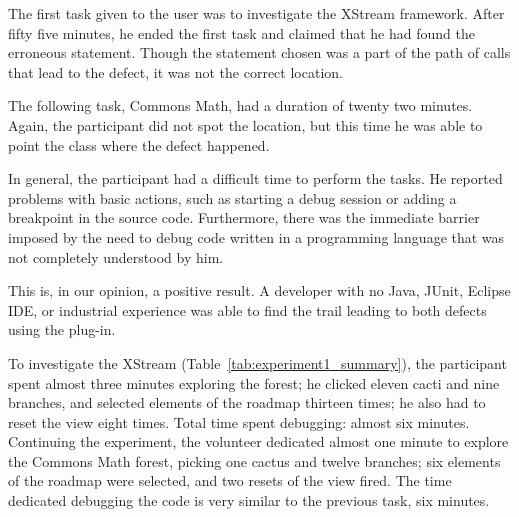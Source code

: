 The first task given to the user was to investigate the XStream framework. After
fifty five minutes, he ended the first task and claimed that he had found the
erroneous statement. Though the statement chosen was a part of the path of calls
that lead to the defect, it was not the correct location.

The following task, Commons Math, had a duration of twenty two minutes. Again,
the participant did not spot the location, but this time he was able to point
the class where the defect happened.

In general, the participant had a difficult time to perform the tasks. He
reported problems with basic actions, such as starting a debug session or
adding a breakpoint in the source code. Furthermore, there was the immediate
barrier imposed by the need to debug code written in a programming language that
was not completely understood by him.

This is, in our opinion, a positive result. A developer with no Java,
JUnit, Eclipse IDE, or industrial experience was able to find the trail leading
to both defects using the plug-in.

To investigate the XStream (Table~\ref{tab:experiment1_summary}), the
participant spent almost three minutes exploring the forest; he clicked eleven
cacti and nine branches, and selected elements of the roadmap thirteen times;
he also had to reset the view eight times. Total time spent debugging: almost six
minutes. Continuing the experiment, the volunteer dedicated almost one minute to
explore the Commons Math forest, picking one cactus and twelve branches; six
elements of the roadmap were selected, and two resets of the view fired. The
time dedicated debugging the code is very similar to the previous task, six minutes.

